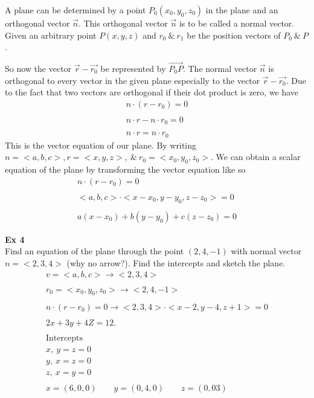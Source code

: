 \documentclass{article}
\begin{document}
  A plane can be determined  by a point $ P_{0} (x_{0},y_{0}, z_{0})$ in the plane and an orthogonal vector $ \vec{n} $. This orthogonal vector $ \vec{n} $ is to be called a normal vector. Given an arbitrary point $ P(x,y,z) $ and $ r_{0} ~\&~ r_{1} $ be the position vectors of $ P_{0} ~\&~ P$.

  So now the vector $ \vec{r}-\vec{r_{0} }$ be represented by $ \vec{P_{0}P} $. The normal vector $ \vec{n} $ is orthogonal to every vector in the given plane especially to the vector $ \vec{r}-\vec{r_{0} } $. Due to the fact that two vectors are orthogonal if their dot product is zero, we have
  \[
    \begin{gathered}
    n \cdot (r-r_{0} )=0\\
    ~\\
    n \cdot r - n \cdot r_{0}=0\\
    ~\\
    n \cdot r = n \cdot r_{0} 
    \end{gathered}
  \]
  This is the vector equation of our plane. By writing $ n=< a, b, c >, r= < x, y, z>, ~\&~ r_{0}=< x_{0}, y_{0} , z_{0}  >    $. We can obtain a scalar equation of the plane by transforming the vector equation like so
  \[
    \begin{gathered}
    n \cdot (r-r_{0})=0\\
    ~\\
    < a, b, c > \cdot < x-x_{0} , y-y_{0} , z-z_{0} > = 0\\
    ~\\
    \boxed{a(x-x_{0}) + b(y-y_{0} )+c(z-z_{0} )=0} 
    \end{gathered}
  \]

  \textbf{Ex 4}\\
  Find an equation of the plane through the point $ (2,4,-1) $ with normal vector $ n=< 2, 3, 4 >  $ (why no arrow?). Find the intercepts and sketch the plane.
  \[
    \begin{gathered}
    v=< a, b, c>\to < 2, 3, 4 >\\
    ~\\
    r_{0} =< x_{0} , y_{0} , z_{0}  > \to < 2, 4, -1 >\\
    ~\\
    n \cdot (r-r_{0} ) = 0 \to < 2, 3, 4 > \cdot < x-2, y-4, z+1 > = 0\\
    ~\\
    2x+3y+4Z=12.\\
    ~\\
    \text{Intercepts}\\
    x,~y=z=0\\
    y,~x=z=0\\
    z,~x=y=0\\
    ~\\
    x = (6,0,0) \qquad y = (0,4,0) \qquad z=(0,03)
    \end{gathered}
  \]
 
\end{document}

